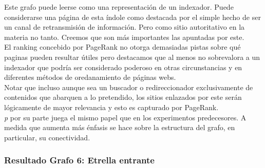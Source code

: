 Este grafo puede leerse como una representación de un indexador. Puede considerarse una página de esta índole como destacada por el simple hecho de ser un canal de retransmisión de información. Pero como sitio autoritativo en la materia no tanto. Creemos que son más importantes las apuntadas por este. \\

El ranking concebido por PageRank no otorga demasiadas pistas sobre qué paginas pueden resultar útiles pero destacamos que al menos no sobrevalora a un indexador que podría ser considerado poderoso en otras circunstancias y en diferentes métodos de oredanamiento de páginas webs. \\
Notar que incluso aunque sea un buscador o redireccionador exclusivamente de contenidos que abarquen a lo pretendido, los sitios enlazados por este serán lógicamente de mayor relevancia y esto es capturado por PageRank.\\

\textit{p} por su parte juega el mismo papel que en los experimentos predecesores. A medida que aumenta más énfasis se hace sobre la estructura del grafo, en particular, su conectividad. \\
            
\subsubsection{Resultado Grafo 6: Etrella entrante} 

